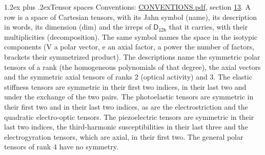 \documentclass[10pt,a4paper]{article}
\makeatletter
\renewcommand\section{\@startsection{section}{1}{\z@}{-3ex plus -1ex minus -.2ex}%
  {1.2ex plus .2ex}{\normalfont\large\sffamily\bfseries\color{parttitle}}}
\numberwithin{equation}{section}
\newcommand{\grp}[1]{\mathsf{#1}}
\makeatother
\begin{document}
\section{Tensor spaces}\label{s:tensor_spaces}
Conventions: \href{../../CONVENTIONS.pdf}{CONVENTIONS.pdf}, section \href{../../CONVENTIONS.pdf\#conv.13}{13}.
\leavevmode\label{n:head.name}\label{n:head.description}\label{n:head.dim}\label{n:head.decomposition}A row is a space of Cartesian tensors, with its Jahn symbol (name), its description in words, its dimension (dim) and the irreps of $\grp{D_{12h}}$ that it carries, with their multiplicities (decomposition). \label{n:label.jahn}The same symbol names the space in the isotypic components (V a polar vector, e an axial factor, a power the number of factors, brackets their symmetrized product). The descriptions name the symmetric polar tensors of a rank (the homogeneous polynomials of that degree), the axial vectors and the symmetric axial tensors of ranks 2 (optical activity) and 3. The elastic stiffness tensors are symmetric in their first two indices, in their last two and under the exchange of the two pairs. The photoelastic tensors are symmetric in their first two and in their last two indices, as are the electrostriction and the quadratic electro-optic tensors. The piezoelectric tensors are symmetric in their last two indices, the third-harmonic susceptibilities in their last three and the electrogyration tensors, which are axial, in their first two. The general polar tensors of rank 4 have no symmetry.
\end{document}
